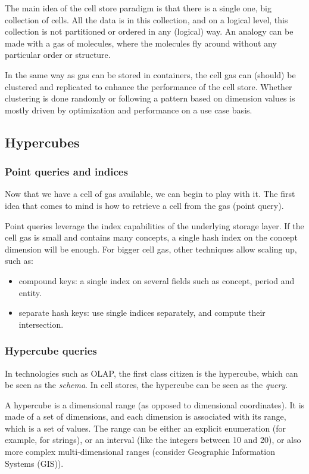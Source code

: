 \documentclass{vldb}
\begin{document}
The main idea of the cell store paradigm is that there is a single one, big collection of cells. All the data is in this collection, and on a logical level, this collection is not partitioned or ordered in any (logical) way. An analogy can be made with a gas of molecules, where the molecules fly around without any particular order or structure.

In the same way as gas can be stored in containers, the cell gas can (should) be clustered and replicated to enhance the performance of the cell store. Whether clustering is done randomly or following a pattern based on dimension values is mostly driven by optimization and performance on a use case basis.

\subsection{Hypercubes}

\subsubsection{Point queries and indices}

Now that we have a cell of gas available, we can begin to play with it. The first idea that comes to mind is how to retrieve a cell from the gas (point query).

Point queries leverage the index capabilities of the underlying storage layer. If the cell gas is small and contains many concepts, a single hash index on the concept dimension will be enough. For bigger cell gas, other techniques allow scaling up, such as:
\begin{itemize}
\item compound keys: a single index on several fields such as concept, period and entity.
\item separate hash keys: use single indices separately, and compute their intersection.
\end{itemize}

\subsubsection{Hypercube queries}
In technologies such as OLAP, the first class citizen is the hypercube, which can be seen as the \emph{schema}. In cell stores, the hypercube can be seen as the \emph{query}.

A hypercube is a dimensional range (as opposed to dimensional coordinates). It is made of a set of dimensions, and each dimension is associated with its range, which is a set of values. The range can be either an explicit enumeration (for example, for strings), or an interval (like the integers between 10 and 20), or also more complex multi-dimensional ranges (consider Geographic Information Systems (GIS)).
\end{document}
